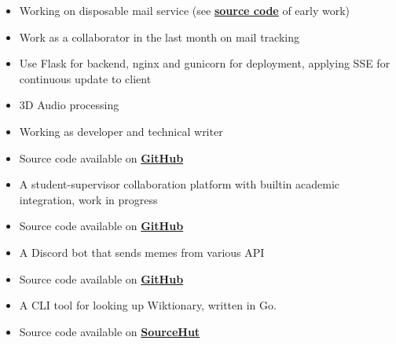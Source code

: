 
\begin{itemize}
\item Working on disposable mail service (see \textbf{\href{https://github.com/Huy-Ngo/temp-mail}{source code}} of early work)
\item Work as a collaborator in the last month on mail tracking
\item Use Flask for backend, nginx and gunicorn for deployment, applying SSE for continuous update to client
\end{itemize}

\begin{itemize}
\item 3D Audio processing
\item Working as developer and technical writer
\item Source code available on \textbf{\href{https://github.com/McSinyx/palace}{GitHub}}
\end{itemize}

\divider

\begin{itemize}
\item A student-supervisor collaboration platform with builtin academic integration, work in progress
\item Source code available on \textbf{\href{https://github.com/Huy-Ngo/acanban}{GitHub}}
\end{itemize}

\divider

\begin{itemize}
\item A Discord bot that sends memes from various API
\item Source code available on \textbf{\href{https://github.com/Huy-Ngo/discord-meme-bot}{GitHub}}
\end{itemize}

\divider

\begin{itemize}
\item A CLI tool for looking up Wiktionary, written in Go.
\item Source code available on \textbf{\href{https://sr.ht/~huyngo/wikt-cli}{SourceHut}}
\end{itemize}
